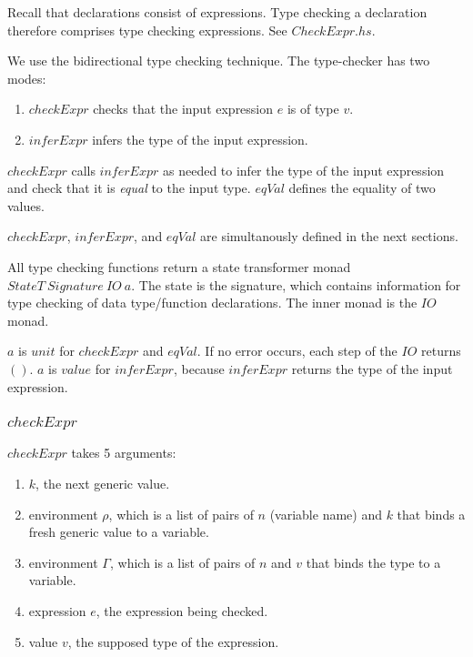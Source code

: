 Recall that declarations consist of expressions. Type checking a declaration therefore comprises type checking expressions. See $CheckExpr.hs$.

We use the bidirectional type checking technique. The type-checker has two modes:

\begin{enumerate}
  \item $checkExpr$ checks that the input expression $e$ is of type $v$.
  \item $inferExpr$ infers the type of the input expression.
\end{enumerate}

$checkExpr$ calls $inferExpr$ as needed to infer the type of the input expression and check that it is \emph{equal} to the input type. $eqVal$ defines the equality of two values.

$checkExpr$, $inferExpr$, and $eqVal$ are simultanously defined in the next sections.

All type checking functions return a state transformer monad $StateT \: Signature \: IO \: a$. The state is the signature, which contains information for type checking of data type/function declarations. The inner monad is the $IO$ monad.

$a$ is $unit$ for $checkExpr$ and $eqVal$. If no error occurs, each step of the $IO$ returns $\boldsymbol{()}$. $a$ is $value$ for $inferExpr$, because $inferExpr$ returns the type of the input expression.

\subsubsection{$checkExpr$}
\label{sec:checkExpr}

$checkExpr$ takes 5 arguments:

\begin{enumerate}
  \item $k$, the next generic value.
  \item environment $\rho$, which is a list of pairs of $n$ (variable name) and $k$ that binds a fresh generic value to a variable.
  \item environment $\Gamma$, which is a list of pairs of $n$ and $v$ that binds the type to a variable.
  \item expression $e$, the expression being checked.
  \item value $v$, the supposed type of the expression.
\end{enumerate}

